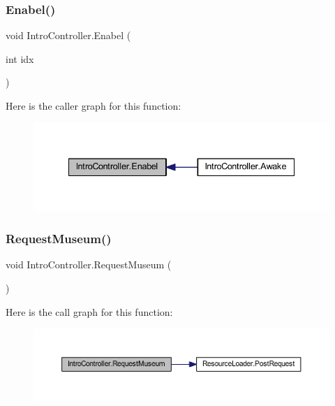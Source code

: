 \subsubsection{\texorpdfstring{Enabel()}{Enabel()}}
{\footnotesize\ttfamily void Intro\+Controller.\+Enabel (\begin{DoxyParamCaption}\item[{int}]{idx }\end{DoxyParamCaption})}

Here is the caller graph for this function\+:
\nopagebreak
\begin{figure}[H]
\begin{center}
\leavevmode
\includegraphics[width=335pt]{class_intro_controller_af189f110e2a1fc56f21c2e5d91af849f_icgraph}
\end{center}
\end{figure}
\mbox{\label{class_intro_controller_afdc3da184119a836c16a44e5615bc2f9}} 
\subsubsection{\texorpdfstring{Request\+Museum()}{RequestMuseum()}}
{\footnotesize\ttfamily void Intro\+Controller.\+Request\+Museum (\begin{DoxyParamCaption}{ }\end{DoxyParamCaption})}

Here is the call graph for this function\+:
\nopagebreak
\begin{figure}[H]
\begin{center}
\leavevmode
\includegraphics[width=350pt]{class_intro_controller_afdc3da184119a836c16a44e5615bc2f9_cgraph}
\end{center}
\end{figure}
\mbox{\label{class_intro_controller_a87be0da70dd6d5aee2808072978c2ff6}} 
